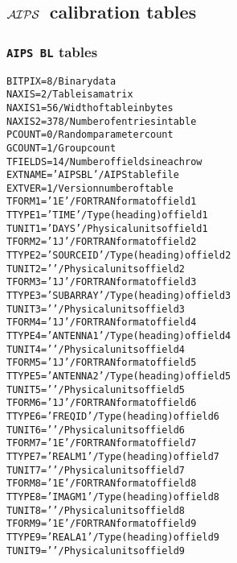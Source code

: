 \documentclass[twoside]{article}
\newcommand{\AIPS}{{$\cal AIPS\/$}}
\begin{document}
\subsection{\AIPS\ calibration tables}

\subsubsection{{\tt AIPS BL} tables}
\label{Appe:BLtable}
\begin{alltt}
BITPIX  =                    8 / Binary data
NAXIS   =                    2 / Table is a matrix
NAXIS1  =                   56 / Width of table in bytes
NAXIS2  =                  378 / Number of entries in table
PCOUNT  =                    0 / Random parameter count
GCOUNT  =                    1 / Group count
TFIELDS =                   14 / Number of fields in each row
EXTNAME = 'AIPS BL '           / AIPS table file
EXTVER  =                    1 / Version number of table
TFORM1  = '1E      '           / FORTRAN format of field  1
TTYPE1  = 'TIME            '   / Type (heading) of field  1
TUNIT1  = 'DAYS    '           / Physical units of field  1
TFORM2  = '1J      '           / FORTRAN format of field  2
TTYPE2  = 'SOURCE ID       '   / Type (heading) of field  2
TUNIT2  = '        '           / Physical units of field  2
TFORM3  = '1J      '           / FORTRAN format of field  3
TTYPE3  = 'SUBARRAY        '   / Type (heading) of field  3
TUNIT3  = '        '           / Physical units of field  3
TFORM4  = '1J      '           / FORTRAN format of field  4
TTYPE4  = 'ANTENNA1        '   / Type (heading) of field  4
TUNIT4  = '        '           / Physical units of field  4
TFORM5  = '1J      '           / FORTRAN format of field  5
TTYPE5  = 'ANTENNA2        '   / Type (heading) of field  5
TUNIT5  = '        '           / Physical units of field  5
TFORM6  = '1J      '           / FORTRAN format of field  6
TTYPE6  = 'FREQ ID         '   / Type (heading) of field  6
TUNIT6  = '        '           / Physical units of field  6
TFORM7  = '1E      '           / FORTRAN format of field  7
TTYPE7  = 'REAL M1         '   / Type (heading) of field  7
TUNIT7  = '        '           / Physical units of field  7
TFORM8  = '1E      '           / FORTRAN format of field  8
TTYPE8  = 'IMAG M1         '   / Type (heading) of field  8
TUNIT8  = '        '           / Physical units of field  8
TFORM9  = '1E      '           / FORTRAN format of field  9
TTYPE9  = 'REAL A1         '   / Type (heading) of field  9
TUNIT9  = '        '           / Physical units of field  9

\end{alltt}
\end{document}
